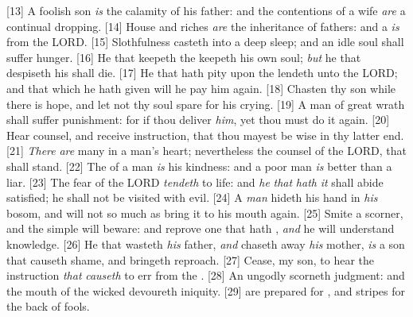 [13] \textcolor[cmyk]{0.99998,1,0,0}{A foolish son \emph{is} the calamity of his father: and the contentions of a wife \emph{are} a continual dropping.}
[14] \textcolor[cmyk]{0.99998,1,0,0}{House and riches \emph{are} the inheritance of fathers: and a  \emph{is} from the LORD.}
[15] \textcolor[cmyk]{0.99998,1,0,0}{Slothfulness casteth into a deep sleep; and an idle soul shall suffer hunger.}
[16] \textcolor[cmyk]{0.99998,1,0,0}{He that keepeth the  keepeth his own soul; \emph{but} he that despiseth his  shall die.}
[17] \textcolor[cmyk]{0.99998,1,0,0}{He that hath pity upon the  lendeth unto the LORD; and that which he hath given will he pay him again.}
[18] \textcolor[cmyk]{0.99998,1,0,0}{Chasten thy son while there is hope, and let not thy soul spare for his crying.}
[19] \textcolor[cmyk]{0.99998,1,0,0}{A man of great wrath shall suffer punishment: for if thou deliver \emph{him}, yet thou must do it again.}
[20] \textcolor[cmyk]{0.99998,1,0,0}{Hear counsel, and receive instruction, that thou mayest be wise in thy latter end.}
[21] \textcolor[cmyk]{0.99998,1,0,0}{\emph{There} \emph{are} many  in a man's heart; nevertheless the counsel of the LORD, that shall stand.}
[22] \textcolor[cmyk]{0.99998,1,0,0}{The  of a man \emph{is} his kindness: and a poor man \emph{is} better than a liar.}
[23] \textcolor[cmyk]{0.99998,1,0,0}{The fear of the LORD \emph{tendeth} to life: and \emph{he} \emph{that} \emph{hath} \emph{it} shall abide satisfied; he shall not be visited with evil.}
[24] \textcolor[cmyk]{0.99998,1,0,0}{A  \emph{man} hideth his hand in \emph{his} bosom, and will not so much as bring it to his mouth again.}
[25] \textcolor[cmyk]{0.99998,1,0,0}{Smite a scorner, and the simple will beware: and reprove one that hath , \emph{and} he will understand knowledge.}
[26] \textcolor[cmyk]{0.99998,1,0,0}{He that wasteth \emph{his} father, \emph{and} chaseth away \emph{his} mother, \emph{is} a son that causeth shame, and bringeth reproach.}
[27] \textcolor[cmyk]{0.99998,1,0,0}{Cease, my son, to hear the instruction \emph{that} \emph{causeth} to err from the .}
[28] \textcolor[cmyk]{0.99998,1,0,0}{An ungodly  scorneth judgment: and the mouth of the wicked devoureth iniquity.}
[29] \textcolor[cmyk]{0.99998,1,0,0}{ are prepared for , and stripes for the back of fools.}


